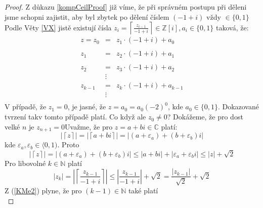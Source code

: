 \documentclass[czech,bachelor,dept470,male]{diploma}
\begin{document}
\begin{proof}\label{kompDF}
	Z důkazu \ref{kompCeilProof} již víme, že při správném postupu při děleni jsme schopni zajistit, aby byl zbytek po dělení číslem $(-1+i)$ vždy $\in\{0,1\}$\newline
	Podle Věty \ref{VX} jistě existují čísla $z_i = \left\lceil\frac{z_{i-1}}{-1+i}\right\rceil \in\mathbb{Z}[i],a_i\in\{0,1\}$ taková, že:
	\begin{equation}\label{KMe1}
		\begin{array}{rcl}
			z = z_0 & =      & z_1\cdot(-1+i) + a_0       \\
			        &        &                            \\
			z_1     & =      & z_2\cdot(-1+i) + a_1       \\
			        &        &                            \\
			z_2     & =      & z_3\cdot(-1+i) + a_2       \\
			        & \vdots &                            \\
			z_{k-1} & =      & z_{k}\cdot(-1+i) + a_{k-1} \\
			        & \vdots &                            \\
		\end{array}
	\end{equation}
	V případě, že $z_1=0$, je jasné, že $z = a_0 = a_0(-2)^0$, kde $a_0\in\{0,1\}$. Dokazované tvrzení tak\newline v tomto případě platí. Co když ale $z_0 \neq 0$?
	Dokážeme, že pro dost velké $n$ je $z_{n+1} = 0$\newline Uvažme, že pro $z = a+bi \in \mathbb{C}$ platí:
	$$\left|\left\lceil z \right\rceil \right| = \left|\left\lceil a + bi \right\rceil\right| = \left| (a+\varepsilon_a) + (b+\varepsilon_b)i \right|$$
	kde $\varepsilon_a, \varepsilon_b \in \langle 0, 1)$. Proto
	$$\left|\left\lceil z \right\rceil\right| = \left| (a+\varepsilon_a) + (b+\varepsilon_b)i \right| \leq
		\left| a +bi \right| + \left| \varepsilon_a + \varepsilon_bi \right| \leq \left| z \right| + \sqrt{2}$$
	Pro libovolné $k \in \mathbb{N}$ platí
	\begin{equation}\label{KMe2}
		|z_k|= \left|\left\lceil\frac{z_{k-1}}{-1+i}\right\rceil\right| \leq
		\left|\frac{z_{k-1}}{-1+i}\right| + \sqrt{2} =
		\frac{\left|z_{k-1}\right|}{\sqrt{2}} + \sqrt{2}
	\end{equation}
	Z (\ref{KMe2}) plyne, že pro $(k-1) \in \mathbb{N}$ také platí
	\begin{equation}\label{KMe3}

\end{equation}
\end{proof}
\end{document}
